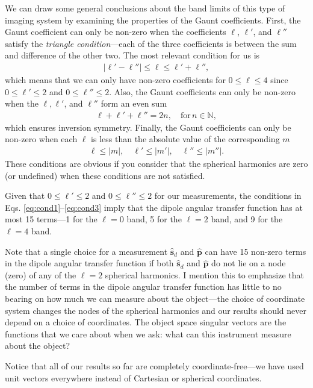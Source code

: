 \documentclass[11pt]{article}
\providecommand{\sd}{\mathbf{\hat{s}}_d}
\providecommand{\pp}{\mathbf{\hat{p}}}
\providecommand{\mbb}[1]{\mathbb{#1}}
\begin{document}
We can draw some general conclusions about the band limits of this type of
imaging system by examining the properties of the Gaunt coefficients. First, the
Gaunt coefficient can only be non-zero when the coefficients $\ell$, $\ell'$,
and $\ell''$ satisfy the \textit{triangle condition}---each of the three
coefficients is between the sum and difference of the other two. The most
relevant condition for us is 
\begin{align}
  |\ell' - \ell''| \leq \ell \leq \ell' + \ell'', \label{eq:cond1}
\end{align}
which means that we can only have non-zero coefficients for $0\leq \ell \leq 4$
since $0\leq \ell' \leq 2$ and $0\leq \ell'' \leq 2$. Also, the Gaunt
coefficients can only be non-zero when the $\ell, \ell'$, and $\ell''$ form an
even sum
\begin{align}
  \ell + \ell' + \ell'' = 2n, \quad \text{for}\, n \in \mbb{N}, \label{eq:cond2}
\end{align}
which ensures inversion symmetry. Finally, the Gaunt coefficients can only be
non-zero when each $\ell$ is less than the absolute value of the corresponding
$m$
\begin{align}
  \ell \leq |m|,\quad\ell' \leq |m'|,\quad\ell'' \leq |m''|.\label{eq:cond3}
\end{align}
These conditions are obvious if you consider that the spherical harmonics are
zero (or undefined) when these conditions are not satisfied.

Given that $0\leq \ell' \leq 2$ and $0 \leq \ell'' \leq 2$ for our measurements, the
conditions in Eqs. \eqref{eq:cond1}--\eqref{eq:cond3} imply that the dipole
angular transfer function has at most 15 terms---1 for the $\ell=0$ band, 5 for
the $\ell=2$ band, and 9 for the $\ell=4$ band.

Note that a single choice for a measurement $\sd$ and $\pp$ can have 15 non-zero
terms in the dipole angular transfer function if both $\sd$ and $\pp$ do not lie
on a node (zero) of any of the $\ell = 2$ spherical harmonics. I mention this to
emphasize that the number of terms in the dipole angular transfer function has
little to no bearing on how much we can measure about the object---the choice of
coordinate system changes the nodes of the spherical harmonics and our results
should never depend on a choice of coordinates. The object space singular
vectors are the functions that we care about when we ask: what can this instrument 
measure about the object?

Notice that all of our results so far are completely coordinate-free---we have
used unit vectors everywhere instead of Cartesian or spherical coordinates. 
\end{document}
